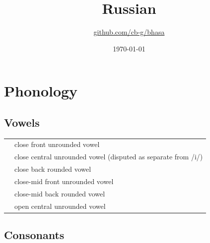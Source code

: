 \documentclass{article}
\title{Russian\\\ipa{["rusk\super jij j@"zik]}}
\author{\href{https://github.com/cb-g/bhasa}{github.com/cb-g/bhasa}}
\date{\today}
\begin{document}
\pagecolor{custom_bg}\color{custom_fg}
\maketitle\thispagestyle{empty}

\newpage\setcounter{page}{1}\section{Phonology}

\subsection{Vowels}

\begin{xltabular}{\textwidth}{lL}
   & close front unrounded vowel \\
   & close central unrounded vowel (disputed as separate from /i/) \\
   & close back rounded vowel \\
   & close-mid front unrounded vowel \\
   & close-mid back rounded vowel \\
   & open central unrounded vowel \\
\end{xltabular}

\subsection{Consonants}
\end{document}
